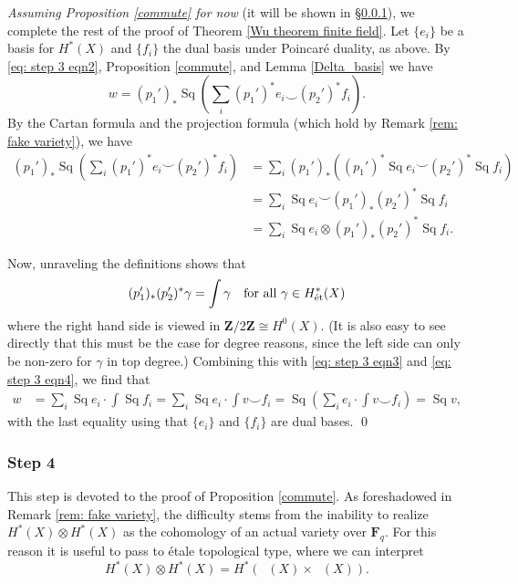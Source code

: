 \documentclass[10pt, reqno]{amsart}
\numberwithin{equation}{subsection}
\newcommand{\F}{\mathbf{F}}
\newcommand{\Z}{\mathbf{Z}}
\DeclareMathOperator{\et}{\acute{e}t}
\DeclareMathOperator{\Sq}{Sq}
\DeclareMathOperator{\Et}{\acute{E}t}
\theoremstyle{remark}
\begin{document}
\emph{Assuming Proposition \ref{commute} for now} (it will be shown in \S \ref{battlefield}), we complete the rest of the proof of Theorem \ref{Wu theorem finite field}. Let $\{e_i\}$ be a basis for $H^*_{\et}(X)$ and $\{f_i\}$ the dual basis under Poincar\'{e} duality, as above. By \eqref{eq: step 3 eqn2}, Proposition \ref{commute}, and Lemma \ref{Delta_basis} we have 
\begin{equation}\label{eq: step 3 eqn3}
w = (p_1')_* \Sq \left(\sum_i  (p_1')^* e_i \smile  (p_2')^* f_i \right).
\end{equation}
By the Cartan formula and the projection formula (which hold by Remark \ref{rem: fake variety}), we have
\begin{align}\label{eq: step 3 eqn4}
(p_1')_* \Sq \left(\sum_i  (p_1')^* e_i \smile  (p_2')^* f_i \right) &=   \sum_i (p_1')_* \left( (p_1')^* \Sq e_i \smile (p_2')^* \Sq f_i \right) \nonumber\\
&= \sum_i  \Sq e_i \smile  (p_1')_*(p_2')^* \Sq f_i \nonumber \\
&= \sum_i \Sq e_i \otimes (p_1')_* (p_2')^* \Sq f_i .
\end{align}

Now, unraveling the definitions shows that
\[
(p_1')_* (p_2')^*  \gamma =  \int \gamma  \quad \text{for all $ \gamma \in H^*_{\et}(X)$}
\]
where the right hand side is viewed in $\Z/2\Z \cong H^0_{\et}(X)$. (It is also easy to see directly that this must be the case for degree reasons, since the left side can only be non-zero for $\gamma$ in top degree.) Combining this with \eqref{eq: step 3 eqn3} and \eqref{eq: step 3 eqn4}, we find that 
\begin{align*}
w &= \sum_i \Sq e_i  \cdot \int \Sq f_i = \sum_i \Sq e_i \cdot \int v \smile f_i  = \Sq  \left(\sum_i e_i \cdot \int v \smile f_i \right) = \Sq v,
\end{align*}
with the last equality using that $\{e_i\}$ and $\{f_i\}$ are dual bases. \qed




\subsubsection{Step 4}\label{battlefield}
This step is devoted to the proof of Proposition \ref{commute}. As foreshadowed in Remark \ref{rem: fake variety}, the difficulty stems from the inability to realize $H^*_{\et}(X) \otimes H^*_{\et}(X)$ as  the cohomology of an actual variety over $\F_q$. For this reason it is useful to pass to \'{e}tale topological type, where we can interpret
\[
H^*_{\et}(X) \otimes H^*_{\et}(X) = H^*_{\et}(\Et(X)\times \Et(X)).
\]
\end{document}
